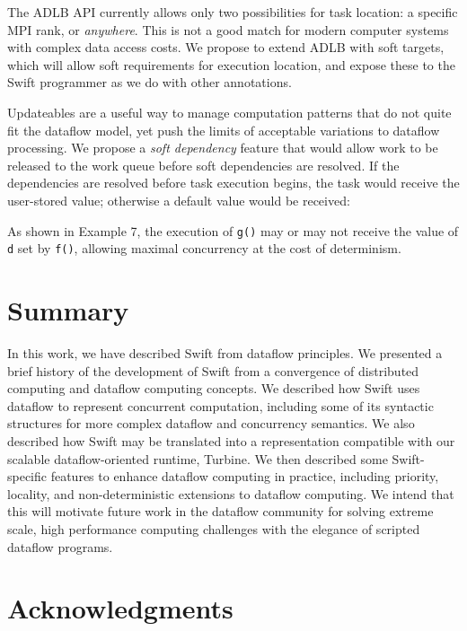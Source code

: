 \documentclass[conference,10pt]{IEEEtran}
\begin{document}
The ADLB API currently allows only two possibilities for task
location: a specific MPI rank, or \emph{anywhere}.  This is not a good
match for modern computer systems with complex data access costs.  We
propose to extend ADLB with soft targets, which will allow soft
requirements for execution location, and expose these to the Swift
programmer as we do with other annotations. 

Updateables are a useful way to manage computation patterns that do
not quite fit the dataflow model, yet push the limits of acceptable
variations to dataflow processing.  We propose a \emph{soft
  dependency} feature that would allow work to be released to the work
queue before soft dependencies are resolved.  If the dependencies are
resolved before task execution begins, the task would receive the
user-stored value; otherwise a default value would be received:

As shown in Example 7, the execution of \texttt{g()} may or may not
receive the value of \texttt{d} set by \texttt{f()}, allowing maximal
concurrency at the cost of determinism. 


\section{Summary}
\label{section:summary}

In this work, we have described Swift from dataflow principles.  We
presented a brief history of the development of Swift from a
convergence of distributed computing and dataflow computing concepts.
We described how Swift uses dataflow to represent concurrent
computation, including some of its syntactic structures for more
complex dataflow and concurrency semantics.  We also described how
Swift may be translated into a representation compatible with our
scalable dataflow-oriented runtime, Turbine.  We then described some
Swift-specific features to enhance dataflow computing in practice,
including priority, locality, and non-deterministic extensions to
dataflow computing.  We intend that this will motivate future work in
the dataflow community for solving extreme scale, high performance
computing challenges with the elegance of scripted dataflow programs. 

\section*{Acknowledgments}
\end{document}
